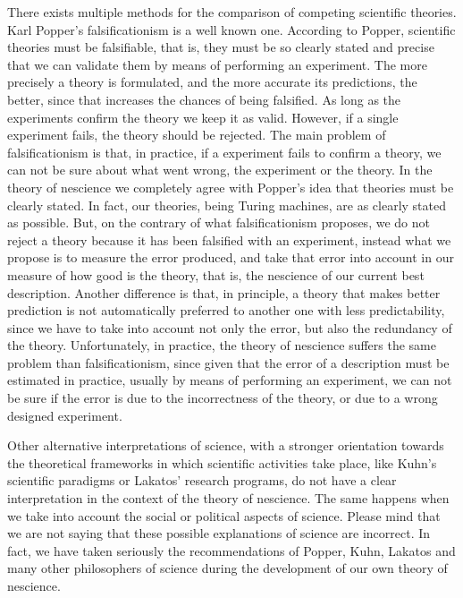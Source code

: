 There exists multiple methods for the comparison of competing scientific theories. Karl Popper's falsificationism is a well known one. According to Popper, scientific theories must be falsifiable, that is, they must be so clearly stated and precise that we can validate them by means of performing an experiment. The more precisely a theory is formulated, and the more accurate its predictions, the better, since that increases the chances of being falsified. As long as the experiments confirm the theory we keep it as valid. However, if a single experiment fails, the theory should be rejected. The main problem of falsificationism is that, in practice, if a experiment fails to confirm a theory, we can not be sure about what went wrong, the experiment or the theory. In the theory of nescience we completely agree with Popper's idea that theories must be clearly stated. In fact, our theories, being Turing machines, are as clearly stated as possible. But, on the contrary of what falsificationism proposes, we do not reject a theory because it has been falsified with an experiment, instead what we propose is to measure the error produced, and take that error into account in our measure of how good is the theory, that is, the nescience of our current best description. Another difference is that, in principle, a theory that makes better prediction is not automatically preferred to another one with less predictability, since we have to take into account not only the error, but also the redundancy of the theory. Unfortunately, in practice, the theory of nescience suffers the same problem than falsificationism, since given that the error of a description must be estimated in practice, usually by means of performing an experiment, we can not be sure if the error is due to the incorrectness of the theory, or due to a wrong designed experiment.

Other alternative interpretations of science, with a stronger orientation towards the theoretical frameworks in which scientific activities take place, like Kuhn's scientific paradigms or Lakatos' research programs, do not have a clear interpretation in the context of the theory of nescience. The same happens when we take into account the social or political aspects of science. Please mind that we are not saying that these possible explanations of science are incorrect. In fact, we have taken seriously the recommendations of Popper, Kuhn, Lakatos and many other philosophers of science during the development of our own theory of nescience.

\vskip 0.5cm

